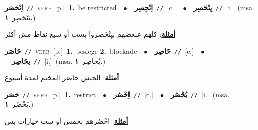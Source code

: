 \documentclass[10pt,a4paper,twoside]{article} %
\begin{document}
\begin{multicols}{2}
{\setlength\topsep{0pt}\textbf{\foreignlanguage{arabic}{اِنْحَصَر}}\ {\color{gray}\texttt{//}\color{black}}\ \textsc{verb}\ [p.]\ \textbf{1.}~be restricted\ \ $\bullet$\ \ \setlength\topsep{0pt}\textbf{\foreignlanguage{arabic}{اِنْحِصِر}}\ {\color{gray}\texttt{//}\color{black}}\ [c.]\ \ $\bullet$\ \ \setlength\topsep{0pt}\textbf{\foreignlanguage{arabic}{يِنْحَصِر}}\ {\color{gray}\texttt{//}\color{black}}\ [i.]\ \color{gray}(msa. \foreignlanguage{arabic}{يَنْحَصِر}~\foreignlanguage{arabic}{\textbf{١.}})\color{black}\  \begin{flushright}\color{gray}\foreignlanguage{arabic}{\textbf{\underline{\foreignlanguage{arabic}{أمثلة}}}: كلهم عبعضهم بيِنْحَصروا بست أو سبع نقاط مش أكثر}\end{flushright}\color{black}} \vspace{2mm}

{\setlength\topsep{0pt}\textbf{\foreignlanguage{arabic}{حَاصَر}}\ {\color{gray}\texttt{//}\color{black}}\ \textsc{verb}\ [p.]\ \textbf{1.}~besiege  \textbf{2.}~blockade\ \ $\bullet$\ \ \setlength\topsep{0pt}\textbf{\foreignlanguage{arabic}{حَاصِر}}\ {\color{gray}\texttt{//}\color{black}}\ [c.]\ \ $\bullet$\ \ \setlength\topsep{0pt}\textbf{\foreignlanguage{arabic}{يحَاصِر}}\ {\color{gray}\texttt{//}\color{black}}\ [i.]\ \color{gray}(msa. \foreignlanguage{arabic}{يُحاصِر}~\foreignlanguage{arabic}{\textbf{١.}})\color{black}\  \begin{flushright}\color{gray}\foreignlanguage{arabic}{\textbf{\underline{\foreignlanguage{arabic}{أمثلة}}}: الجيش حاصَر المخيم لمدة أسبوع}\end{flushright}\color{black}} \vspace{2mm}

{\setlength\topsep{0pt}\textbf{\foreignlanguage{arabic}{حَصَر}}\ {\color{gray}\texttt{//}\color{black}}\ \textsc{verb}\ [p.]\ \textbf{1.}~restrict\ \ $\bullet$\ \ \setlength\topsep{0pt}\textbf{\foreignlanguage{arabic}{اِحْصُر}}\ {\color{gray}\texttt{//}\color{black}}\ [c.]\ \ $\bullet$\ \ \setlength\topsep{0pt}\textbf{\foreignlanguage{arabic}{يُحْصُر}}\ {\color{gray}\texttt{//}\color{black}}\ [i.]\ \color{gray}(msa. \foreignlanguage{arabic}{يَحْصُر}~\foreignlanguage{arabic}{\textbf{١.}})\color{black}\  \begin{flushright}\color{gray}\foreignlanguage{arabic}{\textbf{\underline{\foreignlanguage{arabic}{أمثلة}}}: احْصُرهم بخمس أو ست خيارات بس}\end{flushright}\color{black}} \vspace{2mm}


\end{multicols}
\end{document}
